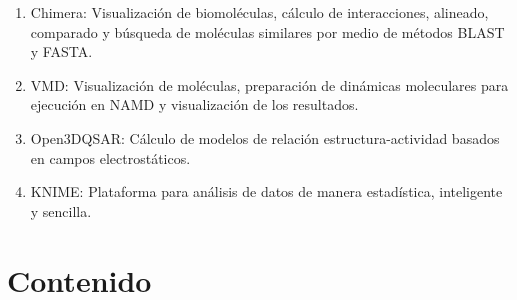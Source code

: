 \documentclass[10pt,letterpaper]{article}
\begin{document}
\begin{enumerate}
\begin{enumerate}
	\item Chimera: Visualizaci\'on de biomol\'eculas, c\'alculo de interacciones, alineado, comparado y b\'usqueda de mol\'eculas similares por medio de m\'etodos BLAST y FASTA.
	\item VMD: Visualizaci\'on de mol\'eculas, preparaci\'on de din\'amicas moleculares para ejecuci\'on en NAMD y visualizaci\'on de los resultados.
	\item Open3DQSAR: C\'alculo de modelos de relaci\'on estructura-actividad basados en campos electrost\'aticos.
	\item KNIME: Plataforma para an\'alisis de datos de manera estad\'istica, inteligente y sencilla.
	\end{enumerate}
\end{enumerate}

\section{Contenido}
\end{document}
